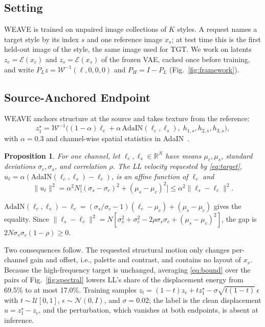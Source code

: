 \documentclass[conference]{IEEEtran}
\newtheorem{proposition}{Proposition}
\begin{document}
\subsection{Setting}
WEAVE is trained on unpaired image collections of $K$ styles. A request names a target style by its index
$s$ and one reference image $x_s$; at test time this is the first held-out image of the style, the same
image used for TGT. We work on latents $z_c=\mathcal E(x_c)$ and $z_s=\mathcal E(x_s)$ of the frozen VAE,
cached once before training, and write $P_Lz=\mathcal W^{-1}(\ell,0,0,0)$ and $P_H=I-P_L$
(Fig.~\ref{fig:framework}).

\subsection{Source-Anchored Endpoint}
WEAVE anchors structure at the source and takes texture from the reference:
\begin{equation}
z_1^\star=\mathcal W^{-1}\big((1{-}\alpha)\ell_c+\alpha\,\mathrm{AdaIN}(\ell_c,\ell_s),\;h_{1,s},h_{2,s},h_{3,s}\big),
\label{eq:target}
\end{equation}
with $\alpha=0.3$ and channel-wise spatial statistics in AdaIN~\cite{huang2017arbitrary}.

\begin{proposition}
\label{prop:anchor}
For one channel, let $\ell_c,\ell_s\in\mathbb R^N$ have means $\mu_c,\mu_s$, standard deviations
$\sigma_c,\sigma_s$, and correlation $\rho$. The LL velocity requested by \eqref{eq:target},
$u_\ell=\alpha(\mathrm{AdaIN}(\ell_c,\ell_s)-\ell_c)$, is an affine function of $\ell_c$ and
\begin{equation}
\|u_\ell\|^2=\alpha^2N\big[(\sigma_s-\sigma_c)^2+(\mu_s-\mu_c)^2\big]\le\alpha^2\|\ell_s-\ell_c\|^2.
\label{eq:bound}
\end{equation}
\end{proposition}
\begin{IEEEproof}
$\mathrm{AdaIN}(\ell_c,\ell_s)-\ell_c=(\sigma_s/\sigma_c-1)(\ell_c-\mu_c)+(\mu_s-\mu_c)$ gives the equality.
Since $\|\ell_s-\ell_c\|^2=N[\sigma_s^2+\sigma_c^2-2\rho\sigma_s\sigma_c+(\mu_s-\mu_c)^2]$, the gap is
$2N\sigma_s\sigma_c(1-\rho)\ge0$.
\end{IEEEproof}

Two consequences follow. The requested structural motion only changes per-channel gain and offset,
i.e., palette and contrast, and contains no layout of $x_s$. Because the high-frequency target is
unchanged, averaging \eqref{eq:bound} over the pairs of Fig.~\ref{fig:spectral} lowers LL's share of
the displacement energy from 69.5\% to at most 17.0\%. Training samples
$z_t=(1-t)z_c+tz_1^\star-\sigma\sqrt{t(1-t)}\,\epsilon$ with $t\sim\mathcal U[0,1]$,
$\epsilon\sim\mathcal N(0,I)$, and $\sigma=0.02$; the label is the clean displacement $u=z_1^\star-z_c$,
and the perturbation, which vanishes at both endpoints, is absent at inference.
\end{document}
